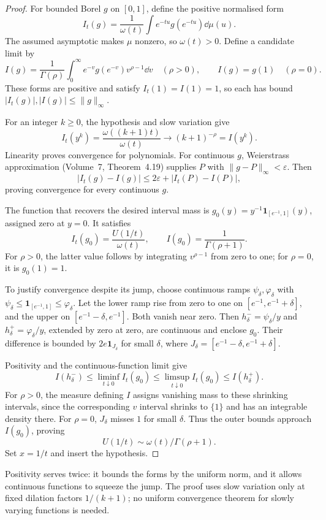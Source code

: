 \begin{proof}
For bounded Borel $g$ on $[0,1]$, define the positive normalised form
\[I_t(g)=\frac1{\omega(t)}\int e^{-tu}g(e^{-tu})\dd\mu(u).
\]
The assumed asymptotic makes $\mu$ nonzero, so $\omega(t)>0$. Define a candidate limit by
\[I(g)=\frac1{\Gamma(\rho)}\int_0^\infty e^{-v}g(e^{-v})v^{\rho-1}\dd v\quad(\rho>0),\qquad I(g)=g(1)\quad(\rho=0).
\]
These forms are positive and satisfy $I_t(1)=I(1)=1$, so each has bound $|I_t(g)|,|I(g)|\le\|g\|_\infty$.

For an integer $k\ge0$, the hypothesis and slow variation give
\[I_t(y^k)=\frac{\omega((k+1)t)}{\omega(t)}\longrightarrow(k+1)^{-\rho}=I(y^k).
\]
Linearity proves convergence for polynomials. For continuous $g$, Weierstrass approximation (Volume~7, Theorem~4.19) supplies $P$ with $\|g-P\|_\infty<\varepsilon$. Then
\[|I_t(g)-I(g)|\le2\varepsilon+|I_t(P)-I(P)|,
\]
proving convergence for every continuous $g$.

The function that recovers the desired interval mass is $g_0(y)=y^{-1}\mathbf1_{[e^{-1},1]}(y)$, assigned zero at $y=0$. It satisfies
\[I_t(g_0)=\frac{U(1/t)}{\omega(t)},\qquad I(g_0)=\frac1{\Gamma(\rho+1)}.
\]
For $\rho>0$, the latter value follows by integrating $v^{\rho-1}$ from zero to one; for $\rho=0$, it is $g_0(1)=1$.

To justify convergence despite its jump, choose continuous ramps $\psi_\delta,\varphi_\delta$ with $\psi_\delta\le\mathbf1_{[e^{-1},1]}\le\varphi_\delta$. Let the lower ramp rise from zero to one on $[e^{-1},e^{-1}+\delta]$, and the upper on $[e^{-1}-\delta,e^{-1}]$. Both vanish near zero. Then $h^-_\delta=\psi_\delta/y$ and $h^+_\delta=\varphi_\delta/y$, extended by zero at zero, are continuous and enclose $g_0$. Their difference is bounded by $2e\mathbf1_{J_\delta}$ for small $\delta$, where $J_\delta=[e^{-1}-\delta,e^{-1}+\delta]$.

Positivity and the continuous-function limit give
\[I(h^-_\delta)\le\liminf_{t\downarrow0}I_t(g_0)
 \le\limsup_{t\downarrow0}I_t(g_0)\le I(h^+_\delta).
\]
For $\rho>0$, the measure defining $I$ assigns vanishing mass to these shrinking intervals, since the corresponding $v$ interval shrinks to $\{1\}$ and has an integrable density there. For $\rho=0$, $J_\delta$ misses $1$ for small $\delta$. Thus the outer bounds approach $I(g_0)$, proving
\[U(1/t)\sim\omega(t)/\Gamma(\rho+1).
\]
Set $x=1/t$ and insert the hypothesis.
\end{proof}

Positivity serves twice: it bounds the forms by the uniform norm, and it allows continuous functions to squeeze the jump. The proof uses slow variation only at fixed dilation factors $1/(k+1)$; no uniform convergence theorem for slowly varying functions is needed.

